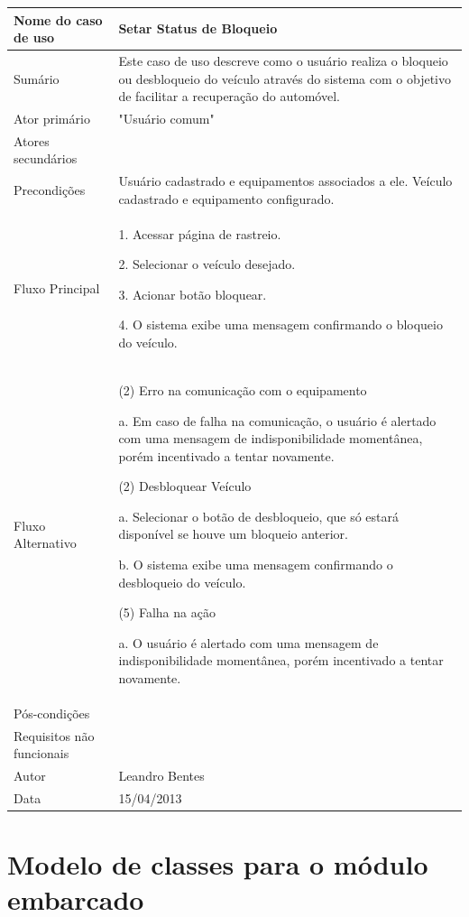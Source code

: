 \newpage
\begin{flushleft}
\tablefirsthead{}
\tablehead{}
\tabletail{}
\tablelasttail{}
\begin{supertabular}{|m{5.5680003cm}|m{9.325cm}|}
\hline
Nome do caso de uso &
Setar Status de Bloqueio\\\hline
Sumário &
Este caso de uso descreve como o usuário realiza o bloqueio ou desbloqueio do veículo através do sistema com o objetivo de facilitar a recuperação do automóvel. \\\hline
Ator primário &
"Usuário comum"\\\hline
Atores secundários &
~
\\\hline
Precondições &
Usuário cadastrado e equipamentos associados a ele. Veículo cadastrado e equipamento configurado.\\\hline
Fluxo Principal &
1. Acessar página de rastreio.

2. Selecionar o veículo desejado.

3. Acionar botão bloquear.

4. O sistema exibe uma mensagem confirmando o bloqueio do veículo.\\\hline
Fluxo Alternativo &
(2) Erro na comunicação com o equipamento

a. Em caso de falha na comunicação, o usuário é alertado com uma mensagem de indisponibilidade momentânea, porém incentivado a tentar novamente.

(2) Desbloquear Veículo

a. Selecionar o botão de desbloqueio, que só estará disponível se houve um bloqueio anterior.

b. O sistema exibe uma mensagem confirmando o desbloqueio do veículo.

(5) Falha na ação

a. O usuário é alertado com uma mensagem de indisponibilidade momentânea, porém incentivado a tentar novamente.\\\hline
Pós-condições &
~\\\hline
Requisitos não funcionais &
~\\\hline
Autor &
Leandro Bentes\\\hline
Data &
15/04/2013\\\hline
\end{supertabular}
\end{flushleft}

\section{Modelo de classes para o módulo embarcado}

